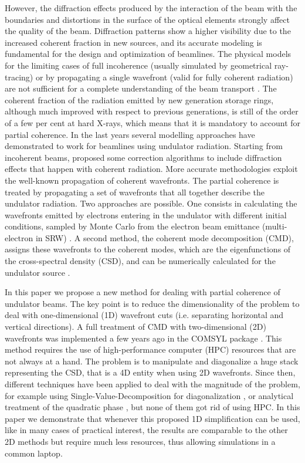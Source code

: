 \documentclass{iucr}              %
\begin{document}
However, the diffraction effects produced by the interaction of the beam with the boundaries and distortions in the surface of the optical elements strongly affect the quality of the beam. Diffraction patterns show a higher visibility due to the increased coherent fraction in new sources, and its accurate modeling is fundamental for the design and optimization of beamlines. The physical models for the limiting cases of full incoherence (usually simulated by geometrical ray-tracing) or by propagating a single wavefront (valid for fully coherent radiation) are not sufficient for a complete understanding of the beam transport \cite{hierarchical}. The coherent fraction of the radiation emitted by new generation storage rings, although much improved with respect to previous generations, is still of the order of a few per cent at hard X-rays, which means that it is mandatory to account for partial coherence. In the last years several modelling approaches have demonstrated to work for beamlines using undulator radiation. Starting from incoherent beams,  proposed some correction algorithms to include diffraction effects that happen with coherent radiation. More accurate methodologies exploit the well-known propagation of coherent wavefronts. The partial coherence is treated by propagating a set of wavefronts that all together describe the undulator radiation. Two approaches are possible. One consists in calculating the wavefronts emitted by electrons entering in the undulator with different initial conditions, sampled by Monte Carlo from the electron beam emittance (multi-electron in SRW) \cite{codeSRW_ME}. A second method, the coherent mode decomposition (CMD), assigns these wavefronts to the coherent modes, which are the eigenfunctions of the cross-spectral density (CSD), and can be numerically calculated for the undulator source \cite{glass2017}.  
 

In this paper we propose a new method for dealing with partial coherence of undulator beams. The key point is to reduce the dimensionality of the problem to deal with one-dimensional (1D) wavefront cuts (i.e. separating horizontal and vertical directions). A full treatment of CMD with two-dimensional (2D) wavefronts was implemented a few years ago in the COMSYL package \cite{codeCOMSYL}. This method requires the use of high-performance computer (HPC) resources that are not always at a hand. The problem is to manipulate and diagonalize a huge stack representing the CSD, that is a 4D entity when using 2D wavefronts. Since then, different techniques have been applied to deal with the magnitude of the problem, for example using Single-Value-Decomposition for diagonalization \cite{SVDHanXu}, or analytical treatment of the quadratic phase \cite{ChubarCMD2022}, but none of them got rid of using HPC. In this paper we demonstrate that whenever this proposed 1D simplification can be used, like in many cases of practical interest, the results are comparable to the other 2D methods but require much less resources, thus allowing simulations in a common laptop. 
\end{document}
